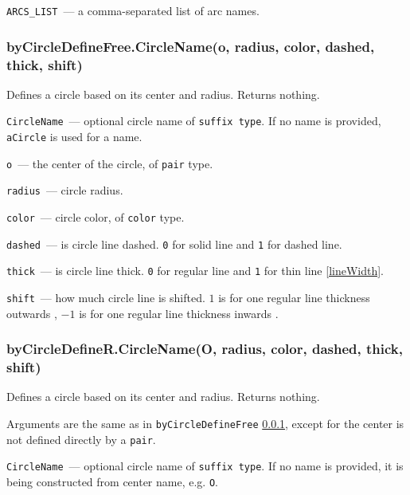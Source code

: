 	\texttt{ARCS\_LIST}~— a comma-separated list of arc names.


\subsubsection{byCircleDefineFree.CircleName(o, radius, color, dashed, thick, shift)}\label{byCircleDefineFree}
	
	Defines a circle based on its center and radius. Returns nothing.
	
	
	\texttt{CircleName}~— optional circle name of \texttt{suffix type}. If no name is provided, \texttt{aCircle} is used for a name.
	
	\texttt{o}~— the center of the circle, of \texttt{pair} type.
	
	\texttt{radius}~— circle radius.
	
	\texttt{color}~— circle color, of \texttt{color} type.
	
	\texttt{dashed}~— is circle line dashed. \texttt{0} for solid line and \texttt{1} for dashed line.
	
	\texttt{thick}~— is circle line thick. \texttt{0} for regular line and \texttt{1} for thin line \ref{lineWidth}.
	
	\texttt{shift}~— how much circle line is shifted. \texttt{$1$} is for one regular line thickness outwards
	, \texttt{$-1$} is for one regular line thickness inwards
	.

\subsubsection{byCircleDefineR.CircleName(O, radius, color, dashed, thick, shift)}\label{byCircleDefineR}
	
	Defines a circle based on its center and radius. Returns nothing.
	
	Arguments are the same as in \texttt{byCircleDefineFree} \ref{byCircleDefineFree}, except for the center is not defined directly by a \texttt{pair}.
	
	\texttt{CircleName}~— optional circle name of \texttt{suffix type}. If no name is provided, it is being constructed from center name, e.g. \texttt{O}.
	
